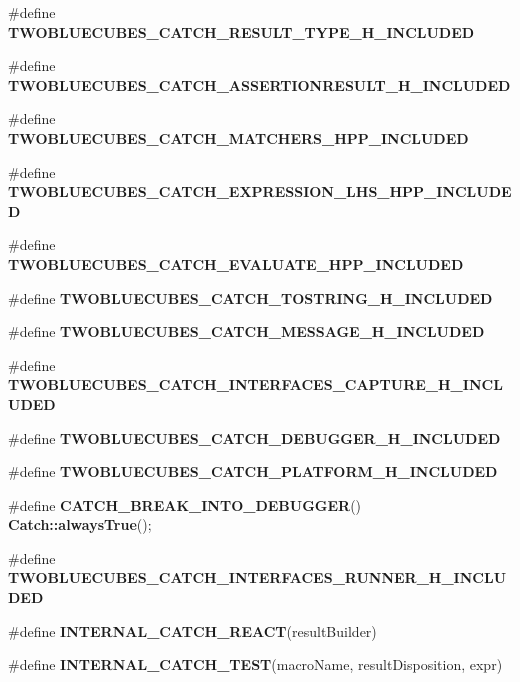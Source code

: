 \begin{DoxyCompactItemize}
\item 
\#define \textbf{ T\+W\+O\+B\+L\+U\+E\+C\+U\+B\+E\+S\+\_\+\+C\+A\+T\+C\+H\+\_\+\+R\+E\+S\+U\+L\+T\+\_\+\+T\+Y\+P\+E\+\_\+\+H\+\_\+\+I\+N\+C\+L\+U\+D\+ED}
\item 
\#define \textbf{ T\+W\+O\+B\+L\+U\+E\+C\+U\+B\+E\+S\+\_\+\+C\+A\+T\+C\+H\+\_\+\+A\+S\+S\+E\+R\+T\+I\+O\+N\+R\+E\+S\+U\+L\+T\+\_\+\+H\+\_\+\+I\+N\+C\+L\+U\+D\+ED}
\item 
\#define \textbf{ T\+W\+O\+B\+L\+U\+E\+C\+U\+B\+E\+S\+\_\+\+C\+A\+T\+C\+H\+\_\+\+M\+A\+T\+C\+H\+E\+R\+S\+\_\+\+H\+P\+P\+\_\+\+I\+N\+C\+L\+U\+D\+ED}
\item 
\#define \textbf{ T\+W\+O\+B\+L\+U\+E\+C\+U\+B\+E\+S\+\_\+\+C\+A\+T\+C\+H\+\_\+\+E\+X\+P\+R\+E\+S\+S\+I\+O\+N\+\_\+\+L\+H\+S\+\_\+\+H\+P\+P\+\_\+\+I\+N\+C\+L\+U\+D\+ED}
\item 
\#define \textbf{ T\+W\+O\+B\+L\+U\+E\+C\+U\+B\+E\+S\+\_\+\+C\+A\+T\+C\+H\+\_\+\+E\+V\+A\+L\+U\+A\+T\+E\+\_\+\+H\+P\+P\+\_\+\+I\+N\+C\+L\+U\+D\+ED}
\item 
\#define \textbf{ T\+W\+O\+B\+L\+U\+E\+C\+U\+B\+E\+S\+\_\+\+C\+A\+T\+C\+H\+\_\+\+T\+O\+S\+T\+R\+I\+N\+G\+\_\+\+H\+\_\+\+I\+N\+C\+L\+U\+D\+ED}
\item 
\#define \textbf{ T\+W\+O\+B\+L\+U\+E\+C\+U\+B\+E\+S\+\_\+\+C\+A\+T\+C\+H\+\_\+\+M\+E\+S\+S\+A\+G\+E\+\_\+\+H\+\_\+\+I\+N\+C\+L\+U\+D\+ED}
\item 
\#define \textbf{ T\+W\+O\+B\+L\+U\+E\+C\+U\+B\+E\+S\+\_\+\+C\+A\+T\+C\+H\+\_\+\+I\+N\+T\+E\+R\+F\+A\+C\+E\+S\+\_\+\+C\+A\+P\+T\+U\+R\+E\+\_\+\+H\+\_\+\+I\+N\+C\+L\+U\+D\+ED}
\item 
\#define \textbf{ T\+W\+O\+B\+L\+U\+E\+C\+U\+B\+E\+S\+\_\+\+C\+A\+T\+C\+H\+\_\+\+D\+E\+B\+U\+G\+G\+E\+R\+\_\+\+H\+\_\+\+I\+N\+C\+L\+U\+D\+ED}
\item 
\#define \textbf{ T\+W\+O\+B\+L\+U\+E\+C\+U\+B\+E\+S\+\_\+\+C\+A\+T\+C\+H\+\_\+\+P\+L\+A\+T\+F\+O\+R\+M\+\_\+\+H\+\_\+\+I\+N\+C\+L\+U\+D\+ED}
\item 
\#define \textbf{ C\+A\+T\+C\+H\+\_\+\+B\+R\+E\+A\+K\+\_\+\+I\+N\+T\+O\+\_\+\+D\+E\+B\+U\+G\+G\+ER}()~\textbf{ Catch\+::always\+True}();
\item 
\#define \textbf{ T\+W\+O\+B\+L\+U\+E\+C\+U\+B\+E\+S\+\_\+\+C\+A\+T\+C\+H\+\_\+\+I\+N\+T\+E\+R\+F\+A\+C\+E\+S\+\_\+\+R\+U\+N\+N\+E\+R\+\_\+\+H\+\_\+\+I\+N\+C\+L\+U\+D\+ED}
\item 
\#define \textbf{ I\+N\+T\+E\+R\+N\+A\+L\+\_\+\+C\+A\+T\+C\+H\+\_\+\+R\+E\+A\+CT}(result\+Builder)
\item 
\#define \textbf{ I\+N\+T\+E\+R\+N\+A\+L\+\_\+\+C\+A\+T\+C\+H\+\_\+\+T\+E\+ST}(macro\+Name,  result\+Disposition,  expr)

\end{DoxyCompactItemize}
